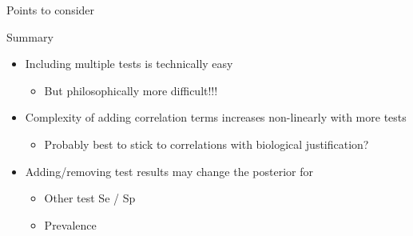 \documentclass[
  ignorenonframetext,
  aspectratio=169,
]{beamer}
\providecommand{\tightlist}{%
  \setlength{\itemsep}{0pt}\setlength{\parskip}{0pt}}
\begin{document}
\begin{frame}[fragile]{Points to consider}
\begin{comment}
\scriptsize

```r
template_huiwalter(covid_data %
results_allcov <- run.jags('covidmodel_allcov.txt')
```

\normalsize

\scriptsize\normalsize

\scriptsize

```r
results_allcov
```

\normalsize

The effective sample size is much lower, because the model is less identifiable.  But otherwise the model does a reasonable job of estimating the parameters due to the large sample size, albeit with wider 95%

\end{comment}
\end{frame}

\begin{frame}[fragile]{Summary}
\protect\hypertarget{summary}{}
\begin{itemize}
\tightlist
\item
  Including multiple tests is technically easy

  \begin{itemize}
  \tightlist
  \item
    But philosophically more difficult!!!
  \end{itemize}
\item
  Complexity of adding correlation terms increases non-linearly with
  more tests

  \begin{itemize}
  \tightlist
  \item
    Probably best to stick to correlations with biological
    justification?
  \end{itemize}
\item
  Adding/removing test results may change the posterior for

  \begin{itemize}
  \tightlist
  \item
    Other test Se / Sp
  \item
    Prevalence
  \end{itemize}
\end{itemize}
\end{frame}
\end{document}
